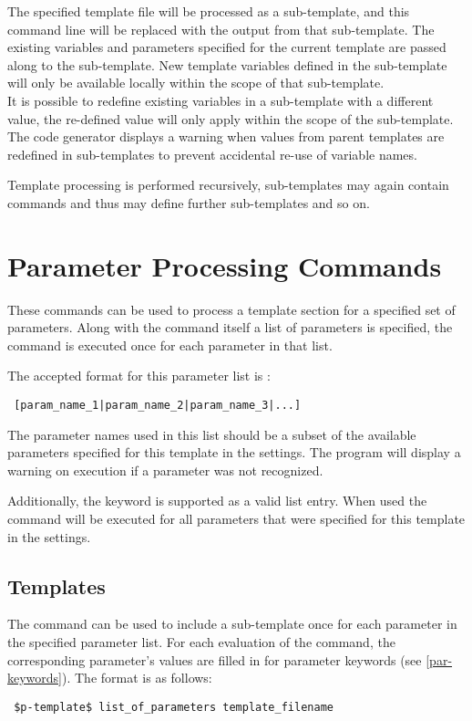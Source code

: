 \documentclass{settings/TU_Delft_Report}
\begin{document}
The specified template file will be processed as a sub-template, and this command line will be replaced with the output from that sub-template. The existing variables and parameters specified for the current template are passed along to the sub-template. New template variables defined in the sub-template will only be available locally within the scope of that sub-template.\\

It is possible to redefine existing variables in a sub-template with a different value, the re-defined value will only apply within the scope of the sub-template. The code generator displays a warning when values from parent templates are redefined in sub-templates to prevent accidental re-use of variable names.

Template processing is performed recursively, sub-templates may again contain commands and thus may define further sub-templates and so on.

\newpage
\section{Parameter Processing Commands} \label{p-commands}
These commands can be used to process a template section for a specified set of parameters. Along with the command itself a list of parameters is specified, the command is executed once for each parameter in that list. 

\vsp The accepted format for this parameter list is :
\begin{lstlisting}
 [param_name_1|param_name_2|param_name_3|...]
\end{lstlisting}

The parameter names used in this list should be a subset of the available parameters specified for this template in the settings. The program will display a warning on execution if a parameter was not recognized.

Additionally, the keyword  is supported as a valid list entry. When used the command will be executed for all parameters that were specified for this template in the settings.

\subsection{Templates} \label{p-template}
The  command can be used to include a sub-template once for each parameter in the specified parameter list. For each evaluation of the command, the corresponding parameter's values are filled in for parameter keywords (see \ref{par-keywords}). The format is as follows:
\begin{lstlisting}
 $p-template$ list_of_parameters template_filename
\end{lstlisting}
\end{document}
